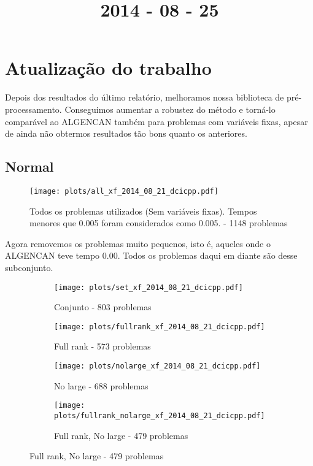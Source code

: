 \documentclass{article}
\title{2014 - 08 - 25}
\author{}
\date{}
\begin{document}
\maketitle
\section{Atualização do trabalho}

Depois dos resultados do último relatório, melhoramos nossa biblioteca de
pré-processamento. Conseguimos aumentar a robustez do método e torná-lo
comparável ao ALGENCAN também para problemas com variáveis fixas, apesar de
ainda não obtermos resultados tão bons quanto os anteriores.

\subsection{Normal}

\begin{figure}[H]
  \centering
  \texttt{[image: plots/all\_xf\_2014\_08\_21\_dcicpp.pdf]}
  \caption{Todos os problemas utilizados (Sem variáveis fixas). Tempos
    menores que 0.005 foram considerados como 0.005. - 1148 problemas}
\end{figure}
Agora removemos os problemas muito pequenos, isto é, aqueles onde o
ALGENCAN teve tempo 0.00. Todos os problemas daqui em diante são desse
subconjunto.

\begin{figure}[H]
  \centering
  \begin{subfigure}{0.48\textwidth}
    \texttt{[image: plots/set\_xf\_2014\_08\_21\_dcicpp.pdf]}
    \caption{Conjunto - 803 problemas}
  \end{subfigure}
  \begin{subfigure}{0.48\textwidth}
    \texttt{[image: plots/fullrank\_xf\_2014\_08\_21\_dcicpp.pdf]}
    \caption{Full rank - 573 problemas}
  \end{subfigure}
  \begin{subfigure}{0.48\textwidth}
    \texttt{[image: plots/nolarge\_xf\_2014\_08\_21\_dcicpp.pdf]}
    \caption{No large - 688 problemas}
  \end{subfigure}
  \begin{subfigure}{0.48\textwidth}
    \texttt{[image: plots/fullrank\_nolarge\_xf\_2014\_08\_21\_dcicpp.pdf]}
    \caption{Full rank, No large - 479 problemas}
  \end{subfigure}
\end{figure}
\end{document}
